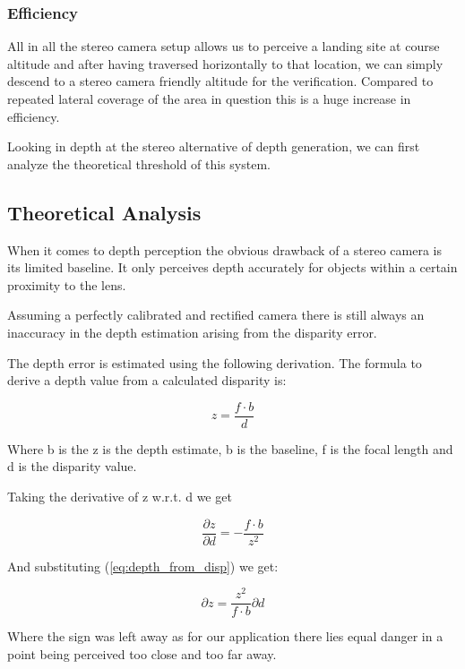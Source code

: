 \subsubsection{Efficiency}

All in all the stereo camera setup allows us to perceive a landing site at course altitude and after having traversed horizontally to that location, we can simply descend to a stereo camera friendly altitude for the verification. Compared to repeated lateral coverage of the area in question this is a huge increase in efficiency.

Looking in depth at the stereo alternative of depth generation, we can first analyze the theoretical threshold of this system.

\subsection{Theoretical Analysis}\label{subsec:theoretical_analysis}

When it comes to depth perception the obvious drawback of a stereo camera is its limited baseline. It only perceives depth accurately for objects within a certain proximity to the lens. 

Assuming a perfectly calibrated and rectified camera there is still always an inaccuracy in the depth estimation arising from the disparity error.

The depth error is estimated using the following derivation. The formula to derive a depth value from a calculated disparity is:

\begin{equation}\label{eq:depth_from_disp}
    z = \frac{f \cdot b}{d}
\end{equation}

Where b is the z is the depth estimate, b is the baseline, f is the focal length and d is the disparity value.

Taking the derivative of z w.r.t. d we get

\begin{equation}
    \frac{\partial z}{\partial d} = - \frac{f  \cdot b}{z^2}
\end{equation}

And substituting (\cref{eq:depth_from_disp}) we get:

\begin{equation}
    {\partial z} = \frac{z^2}{f  \cdot b}\partial d
\end{equation}

Where the sign was left away as for our application there lies equal danger in a point being perceived too close and too far away.

